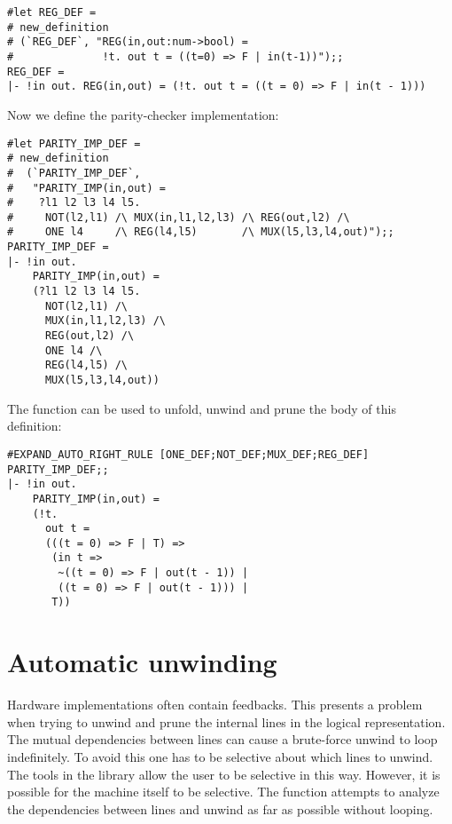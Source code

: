 \begin{session}\begin{verbatim}
#let REG_DEF =
# new_definition
# (`REG_DEF`, "REG(in,out:num->bool) =
#              !t. out t = ((t=0) => F | in(t-1))");;
REG_DEF =
|- !in out. REG(in,out) = (!t. out t = ((t = 0) => F | in(t - 1)))
\end{verbatim}\end{session}

\vfill

\noindent
Now we define the parity-checker implementation:

\begin{session}\begin{verbatim}
#let PARITY_IMP_DEF =
# new_definition
#  (`PARITY_IMP_DEF`,
#   "PARITY_IMP(in,out) =
#    ?l1 l2 l3 l4 l5.
#     NOT(l2,l1) /\ MUX(in,l1,l2,l3) /\ REG(out,l2) /\
#     ONE l4     /\ REG(l4,l5)       /\ MUX(l5,l3,l4,out)");;
PARITY_IMP_DEF =
|- !in out.
    PARITY_IMP(in,out) =
    (?l1 l2 l3 l4 l5.
      NOT(l2,l1) /\
      MUX(in,l1,l2,l3) /\
      REG(out,l2) /\
      ONE l4 /\
      REG(l4,l5) /\
      MUX(l5,l3,l4,out))
\end{verbatim}\end{session}

\noindent
The function  can be used to unfold, unwind and
prune the body of this definition:

\begin{session}\begin{verbatim}
#EXPAND_AUTO_RIGHT_RULE [ONE_DEF;NOT_DEF;MUX_DEF;REG_DEF] PARITY_IMP_DEF;;
|- !in out.
    PARITY_IMP(in,out) =
    (!t.
      out t =
      (((t = 0) => F | T) =>
       (in t =>
        ~((t = 0) => F | out(t - 1)) |
        ((t = 0) => F | out(t - 1))) |
       T))
\end{verbatim}\end{session}


\section{Automatic unwinding}

\def\putbox(#1,#2){\put(#1,#2){\framebox(2,2){}}}

Hardware implementations often contain feedbacks. This presents a problem
when trying to unwind and prune the internal lines in the logical
representation. The mutual dependencies between lines can cause a brute-force
unwind to loop indefinitely. To avoid this one has to be selective about
which lines to unwind. The tools in the  library allow the user
to be selective in this way. However, it is possible for the machine itself to
be selective. The function \ml{UNWIND\_AUTO\_CONV} attempts to analyze the
dependencies between lines and unwind as far as possible without looping.

